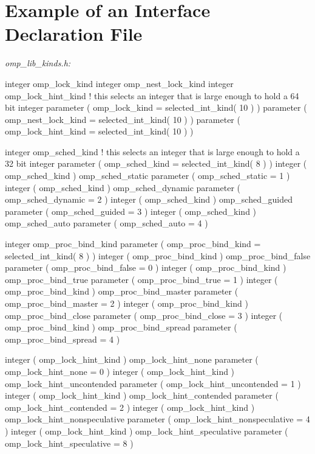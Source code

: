 \pagebreak
{\section{Example of an Interface Declaration  File}}
\label{sec:Example of an Interface Declaration include File}
\emph{omp\_lib\_kinds.h:}
{\small \begin{codepar}
     integer omp\_lock\_kind
     integer omp\_nest\_lock\_kind
     integer omp\_lock\_hint\_kind
! this selects an integer that is large enough to hold a 64 bit integer
     parameter ( omp\_lock\_kind = selected\_int\_kind( 10 ) )
     parameter ( omp\_nest\_lock\_kind = selected\_int\_kind( 10 ) )
     parameter ( omp\_lock\_hint\_kind = selected\_int\_kind( 10 ) )
     
     integer omp\_sched\_kind
! this selects an integer that is large enough to hold a 32 bit integer
     parameter ( omp\_sched\_kind = selected\_int\_kind( 8 ) )
     integer ( omp\_sched\_kind ) omp\_sched\_static
     parameter ( omp\_sched\_static = 1 )
     integer ( omp\_sched\_kind ) omp\_sched\_dynamic
     parameter ( omp\_sched\_dynamic = 2 )
     integer ( omp\_sched\_kind ) omp\_sched\_guided
     parameter ( omp\_sched\_guided = 3 )
     integer ( omp\_sched\_kind ) omp\_sched\_auto
     parameter ( omp\_sched\_auto = 4 )
     
     integer omp\_proc\_bind\_kind
     parameter ( omp\_proc\_bind\_kind = selected\_int\_kind( 8 ) )
     integer ( omp\_proc\_bind\_kind ) omp\_proc\_bind\_false
     parameter ( omp\_proc\_bind\_false = 0 )
     integer ( omp\_proc\_bind\_kind ) omp\_proc\_bind\_true
     parameter ( omp\_proc\_bind\_true = 1 )
     integer ( omp\_proc\_bind\_kind ) omp\_proc\_bind\_master
     parameter ( omp\_proc\_bind\_master = 2 )
     integer ( omp\_proc\_bind\_kind ) omp\_proc\_bind\_close
     parameter ( omp\_proc\_bind\_close = 3 )
     integer ( omp\_proc\_bind\_kind ) omp\_proc\_bind\_spread
     parameter ( omp\_proc\_bind\_spread = 4 )

     integer ( omp\_lock\_hint\_kind ) omp\_lock\_hint\_none
     parameter ( omp\_lock\_hint\_none = 0 )
     integer ( omp\_lock\_hint\_kind ) omp\_lock\_hint\_uncontended
     parameter ( omp\_lock\_hint\_uncontended = 1 )
     integer ( omp\_lock\_hint\_kind ) omp\_lock\_hint\_contended
     parameter ( omp\_lock\_hint\_contended = 2 )
     integer ( omp\_lock\_hint\_kind ) omp\_lock\_hint\_nonspeculative
     parameter ( omp\_lock\_hint\_nonspeculative = 4 )
     integer ( omp\_lock\_hint\_kind ) omp\_lock\_hint\_speculative
     parameter ( omp\_lock\_hint\_speculative = 8 )
\end{codepar}}

